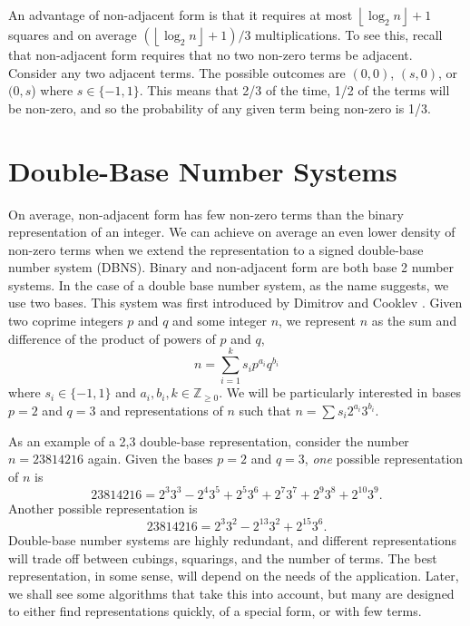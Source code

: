 \documentclass{ucalgthes1}
\theoremstyle{definition}
\newcommand{\ZZgez}{\mathbb{Z}_{\ge 0}}
\newcommand{\floor}[1]{\left\lfloor #1 \right\rfloor}
\begin{document}
An advantage of non-adjacent form is that it requires at most $\floor{\log_2 n}+1$ squares and on average $(\floor{\log_2 n}+1)/3$ multiplications.  To see this, recall that non-adjacent form requires that no two non-zero terms be adjacent.  Consider any two adjacent terms.  The possible outcomes are $(0,0)$, $(s, 0)$, or $(0, s$) where $s \in \{-1, 1\}$. This means that 2/3 of the time, 1/2 of the terms will be non-zero, and so the probability of any given term being non-zero is 1/3.


\bigbreak
\section{Double-Base Number Systems}
\label{sec:dbns}

On average, non-adjacent form has few non-zero terms than the binary representation of an integer.  We can achieve on average an even lower density of non-zero terms when we extend the representation to a signed double-base number system (DBNS).  Binary and non-adjacent form are both base 2 number systems.  In the case of a double base number system, as the name suggests, we use two bases.  This system was first introduced by Dimitrov and Cooklev \cite{Dimitrov1995a, Dimitrov1995b}.  Given two coprime integers $p$ and $q$ and some integer $n$, we represent $n$ as the sum and difference of the product of powers of $p$ and $q$,
\begin{equation}\label{eq:generalDbnsForm}
	n = \sum_{i=1}^k s_i p^{a_i} q^{b_i}
\end{equation}
where $s_i \in \{-1, 1\}$ and $a_i, b_i, k \in \ZZgez$. We will be particularly interested in bases $p=2$ and $q=3$ and representations of $n$ such that $n = \sum s_i 2^{a_i} 3^{b_i}$.

As an example of a 2,3 double-base representation, consider the number $n=23814216$ again.  Given the bases $p=2$ and $q=3$, \emph{one} possible representation of $n$ is
\begin{equation}\label{eq:chainedEg1}
	23814216 = 2^3 3^3 - 2^4 3^5 + 2^5 3^6  + 2^7 3^7  + 2^9 3^8 + 2^{10} 3^9.
\end{equation}
Another possible representation is
\begin{equation}\label{eq:chainedEg2}
	23814216 = 2^3 3^2 -2^{13} 3^2 +2^{15} 3^6.
\end{equation}
Double-base number systems are highly redundant, and different representations will trade off between cubings, squarings, and the number of terms.  The best representation, in some sense, will depend on the needs of the application.  Later, we shall see some algorithms that take this into account, but many are designed to either find representations quickly, of a special form, or with few terms.
\end{document}
